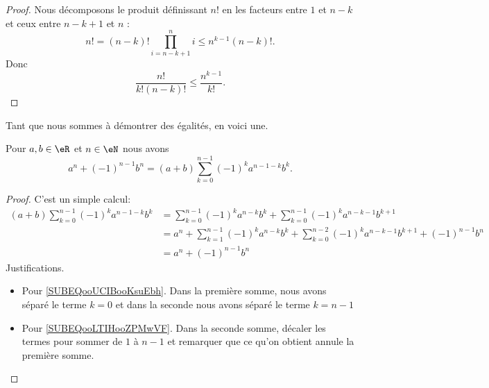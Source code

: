 \begin{proof}
	Nous décomposons le produit définissant \( n!\) en les facteurs entre \( 1\) et \( n-k\) et ceux entre \( n-k+1\) et \( n\) :
	\begin{equation}
		n!=(n-k)!\prod_{i=n-k+1}^ni\leq n^{k-1}(n-k)!.
	\end{equation}
	Donc
	\begin{equation}
		\frac{ n! }{ k!(n-k)! }\leq \frac{ n^{k-1} }{ k! }.
	\end{equation}
\end{proof}

Tant que nous sommes à démontrer des égalités, en voici une.

\begin{lemma}     \label{LEMooLPOQooICJYdV}
	Pour \( a,b\in \eR\) et \( n\in \eN\) nous avons
	\begin{equation}
		a^n+(-1)^{n-1}b^n=(a+b)\sum_{k=0}^{n-1}(-1)^ka^{n-1-k}b^k.
	\end{equation}
\end{lemma}

\begin{proof}
	C'est un simple calcul:
	\begin{subequations}
		\begin{align}
			(a+b)\sum_{k=0}^{n-1}(-1)^ka^{n-1-k}b^k & =  \sum_{k=0}^{n-1}(-1)^ka^{n-k}b^k+\sum_{k=0}^{n-1}(-1)^ka^{n-k-1}b^{k+1}                                                 \\
			                                        & = a^n+\sum_{k=1}^{n-1}(-1)^ka^{n-k}b^k+\sum_{k=0}^{n-2}(-1)^ka^{n-k-1}b^{k+1} +(-1)^{n-1}b^n   \label{SUBEQooUCIBooKsuEbh} \\
			                                        & = a^n+(-1)^{n-1}b^n                                            \label{SUBEQooLTIHooZPMwVF}
		\end{align}
	\end{subequations}
	Justifications.
	\begin{itemize}
		\item Pour \eqref{SUBEQooUCIBooKsuEbh}. Dans la première somme, nous avons séparé le terme \( k=0\) et dans la seconde nous avons séparé le terme \( k=n-1\)
		\item Pour \eqref{SUBEQooLTIHooZPMwVF}. Dans la seconde somme, décaler les termes pour sommer de \( 1\) à \( n-1\) et remarquer que ce qu'on obtient annule la première somme.
	\end{itemize}
\end{proof}


